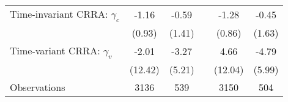 {\begin{tabular}{l*{5}{c}}
\midrule
Time-invariant CRRA: $\gamma_c$&    -1.16    &    -0.59  &    &    -1.28    &    -0.45\\
                &   (0.93)    &   (1.41)     &    &   (0.86)  &   (1.63) \\
\addlinespace
Time-variant CRRA: $\gamma_v$&   -2.01     &    -3.27     &   &     4.66     &    -4.79         \\
    &  (12.42)     &     (5.21)     &    &  (12.04)  &   (5.99)      \\
\midrule
Observations    &     3136    &      539   &    &     3150   &      504 \\
\bottomrule

\end{tabular}
}

